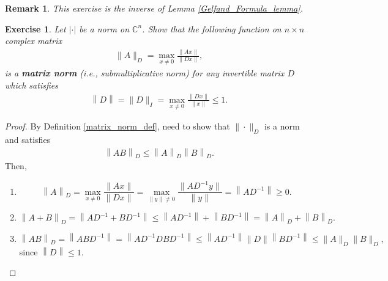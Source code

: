 \documentclass[10pt]{book}
\newtheorem{exercise}{Exercise}[section]
\newtheorem{remark}{Remark}[chapter]
\theoremstyle{definition}
\numberwithin{equation}{chapter}
\begin{document}
\begin{remark}
This exercise is the inverse of Lemma \ref{Gelfand_Formula_lemma}.
\end{remark}

\medskip

\begin{exercise}
Let $|\cdot|$ be a norm on $\mathbb{C}^n$. Show that the following function on $n \times n$ complex matrix
\begin{align*}
    \|A\|_D = \max_{x \neq 0} \frac{\|Ax\|}{\|Dx\|},
\end{align*}
is a {\bf matrix norm} (i.e., submultiplicative norm) for any invertible matrix $D$ which satisfies 
\begin{align*}
    \left\|D\right\| = \|D\|_I = \max_{x\neq 0} \frac{\|Dx\|}{\|x\|} \leq 1.
\end{align*}
\end{exercise}
\begin{proof}
By Definition \ref{matrix_norm_def}, need to show that $\|\cdot \|_D$ is a norm and satisfies
\begin{align*}
    \left\|AB\right\|_D \leq \left\|A\right\|_D \left\|B\right\|_D.
\end{align*}
Then,
\begin{enumerate}[label=(\alph*)]
    \item $$\left\|A\right\|_D = \max_{x \neq 0} \frac{\|Ax\|}{\|Dx\|} = \max_{\|y\|\neq 0} \frac{\|AD^{-1}y\|}{\|y\|} = \left\|AD^{-1}\right\| \geq 0.$$
    
    \item $$\left\|A + B\right\|_D = \left\|AD^{-1} + BD^{-1}\right\| \leq \left\|AD^{-1}\right\| + \left\|BD^{-1}\right\| = \left\|A\right\|_D + \left\|B\right\|_D.$$
    
    \item $$\left\|AB\right\|_D = \left\|ABD^{-1}\right\| = \left\|AD^{-1}DBD^{-1}\right\| \leq \left\|AD^{-1}\right\| \|D\| \left\|BD^{-1}\right\| \leq \|A\|_D \|B\|_D,$$ 
    since $\left\|D\right\| \leq 1$.
\end{enumerate}
\end{proof}

\medskip
\end{document}
